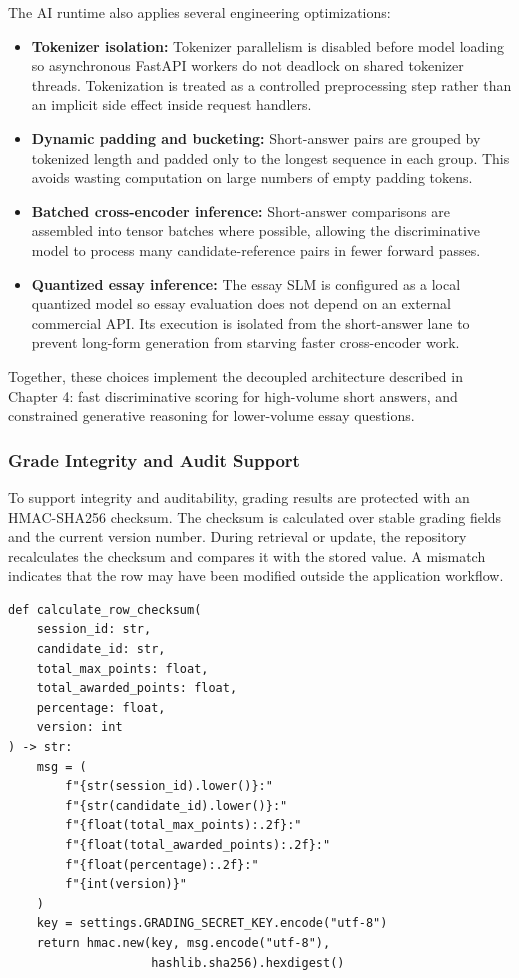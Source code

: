The AI runtime also applies several engineering optimizations:
\begin{itemize}
    \item \textbf{Tokenizer isolation:} Tokenizer parallelism is disabled before model loading so asynchronous FastAPI workers do not deadlock on shared tokenizer threads. Tokenization is treated as a controlled preprocessing step rather than an implicit side effect inside request handlers.
    \item \textbf{Dynamic padding and bucketing:} Short-answer pairs are grouped by tokenized length and padded only to the longest sequence in each group. This avoids wasting computation on large numbers of empty padding tokens.
    \item \textbf{Batched cross-encoder inference:} Short-answer comparisons are assembled into tensor batches where possible, allowing the discriminative model to process many candidate-reference pairs in fewer forward passes.
    \item \textbf{Quantized essay inference:} The essay SLM is configured as a local quantized model so essay evaluation does not depend on an external commercial API. Its execution is isolated from the short-answer lane to prevent long-form generation from starving faster cross-encoder work.
\end{itemize}

Together, these choices implement the decoupled architecture described in Chapter 4: fast discriminative scoring for high-volume short answers, and constrained generative reasoning for lower-volume essay questions.

\subsubsection{Grade Integrity and Audit Support}
To support integrity and auditability, grading results are protected with an HMAC-SHA256 checksum. The checksum is calculated over stable grading fields and the current version number. During retrieval or update, the repository recalculates the checksum and compares it with the stored value. A mismatch indicates that the row may have been modified outside the application workflow.

\begingroup
\footnotesize
\begin{verbatim}
def calculate_row_checksum(
    session_id: str,
    candidate_id: str,
    total_max_points: float,
    total_awarded_points: float,
    percentage: float,
    version: int
) -> str:
    msg = (
        f"{str(session_id).lower()}:"
        f"{str(candidate_id).lower()}:"
        f"{float(total_max_points):.2f}:"
        f"{float(total_awarded_points):.2f}:"
        f"{float(percentage):.2f}:"
        f"{int(version)}"
    )
    key = settings.GRADING_SECRET_KEY.encode("utf-8")
    return hmac.new(key, msg.encode("utf-8"),
                    hashlib.sha256).hexdigest()
\end{verbatim}
\endgroup

